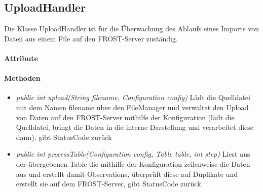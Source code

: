 \subsection{UploadHandler}
Die Klasse UploadHandler ist für die Überwachung des Ablaufs eines Imports von Daten aus einem File auf den FROST-Server zuständig.

\paragraph{Attribute}
\paragraph{Methoden}
\begin{itemize}
\item \textit{public int upload(String filename, Configuration config)} Lädt die Quelldatei mit dem Namen filename über den FileManager und verwaltet den Upload von Daten auf den FROST-Server mithilfe der Konfiguration (lädt die Quelldatei, bringt die Daten in die interne Darstellung und verarbeitet diese dann), gibt StatusCode zurück
\item \textit{public int processTable(Configuration config, Table table, int step)} Liest aus der übergebenen Table die mithilfe der Konfiguration zeilenweise die Daten aus und erstellt damit Observations, überprüft diese auf Duplikate und erstellt sie auf dem FROST-Server, gibt StatusCode zurück
\end{itemize}
